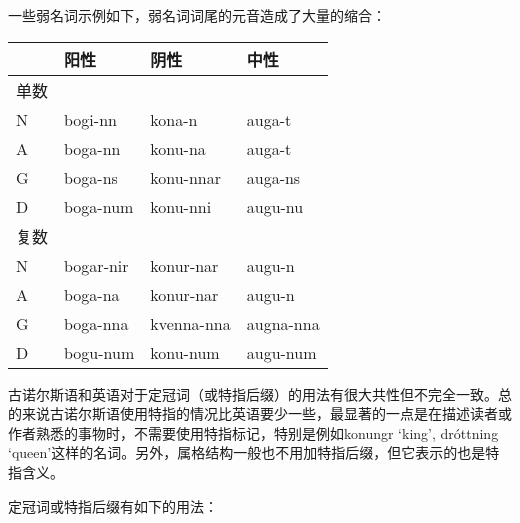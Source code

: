 一些弱名词示例如下，弱名词词尾的元音造成了大量的缩合：

\begin{longtable}{llll}
  \toprule
       & \textbf{阳性}      & \textbf{阴性}       & \textbf{中性}      \\
  \midrule
  \endhead
  \bottomrule
  \endfoot
  单数 &           &            &           \\
  N    & bogi-nn   & kona-n     & auga-t    \\
  A    & boga-nn   & konu-na    & auga-t    \\
  G    & boga-ns   & konu-nnar  & auga-ns   \\
  D    & boga-num  & konu-nni   & augu-nu   \\
  复数 &           &            &           \\
  N    & bogar-nir & konur-nar  & augu-n    \\
  A    & boga-na   & konur-nar  & augu-n    \\
  G    & boga-nna  & kvenna-nna & augna-nna \\
  D    & bogu-num  & konu-num   & augu-num  \\
\end{longtable}

古诺尔斯语和英语对于定冠词（或特指后缀）的用法有很大共性但不完全一致。总的来说古诺尔斯语使用特指的情况比英语要少一些，最显著的一点是在描述读者或作者熟悉的事物时，不需要使用特指标记，特别是例如konungr
`king', dróttning
`queen'这样的名词。另外，属格结构一般也不用加特指后缀，但它表示的也是特指含义。

定冠词或特指后缀有如下的用法：

